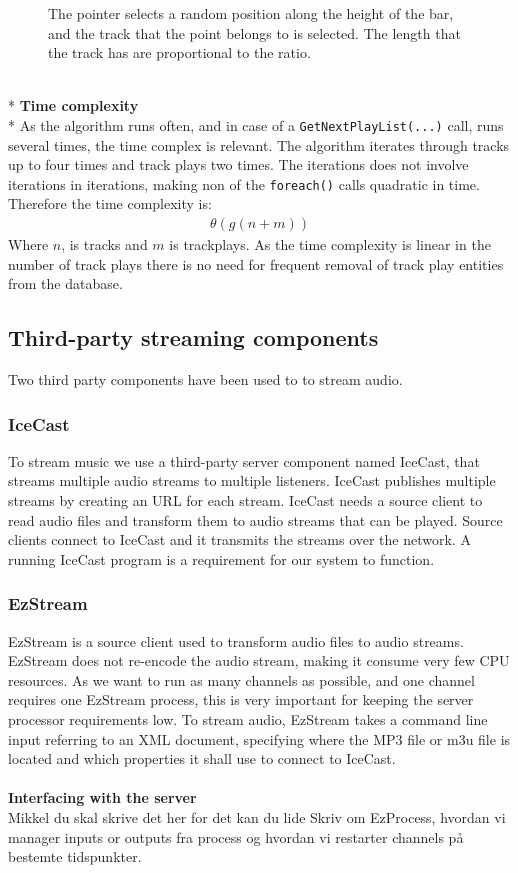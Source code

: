 \documentclass[a4paper,11pt,report]{article}
\begin{document}
{\begin{figure}[htp]
\caption{The pointer selects a random position along the height of the bar, and the track that the point belongs to is selected. The length that the track has are proportional to the ratio.}
\end{figure}
\textbf{ } \\*
\textbf{Time complexity} \\*
As the algorithm runs often, and in case of a \texttt{GetNextPlayList(...)} call, runs several times, the time complex is relevant. The algorithm iterates through tracks up to four times and track plays two times. The iterations does not involve iterations in iterations, making non of the \texttt{foreach()} calls quadratic in time. Therefore the time complexity is: 
\begin{align*}
\theta (g(n + m))
\end{align*}
Where \begin{math}n\end{math}, is tracks and \begin{math}m\end{math} is trackplays. As the time complexity is linear in the number of track plays there is no need for frequent removal of track play entities from the database.

\subsection{Third-party streaming components}
Two third party components have been used to to stream audio.
\subsubsection{IceCast}
To stream music we use a third-party server component named IceCast\cite{IceCast}, that streams multiple audio streams to multiple listeners. IceCast publishes multiple streams by creating an URL for each stream. IceCast needs a source client to read audio files and transform them to audio streams that can be played. Source clients connect to IceCast and it transmits the streams over the network. A running IceCast program is a requirement for our system to function.
\subsubsection{EzStream}
EzStream\cite{EzStream} is a source client used to transform audio files to audio streams. EzStream does not re-encode the audio stream, making it consume very few CPU resources. As we want to run as many channels as possible, and one channel requires one EzStream process, this is very important for keeping the server processor requirements low. To stream audio, EzStream takes a command line input referring to an XML document, specifying where the MP3 file or m3u file is located and which properties it shall use to connect to IceCast. \\ \\
\textbf{Interfacing with the server} \\
Mikkel du skal skrive det her for det kan du lide
Skriv om EzProcess, hvordan vi manager inputs or outputs fra process og hvordan vi restarter channels på bestemte tidspunkter.

}
\end{document}
